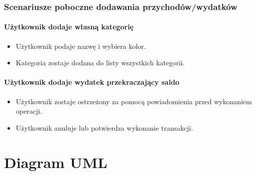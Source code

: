 \documentclass[12pt,a4paper,oneside]{article}
\begin{document}
\subsubsection{Scenariusze poboczne dodawania przychodów/wydatków}
\paragraph{Użytkownik dodaje własną kategorię}
\begin{itemize}
    \item Użytkownik podaje nazwę i wybiera kolor.
    \item Kategoria zostaje dodana do listy wszystkich kategorii.
\end{itemize}

\paragraph{Użytkownik dodaje wydatek przekraczający saldo}
\begin{itemize}
    \item Użytkownik zostaje ostrzeżony za pomocą powiadomienia przed wykonaniem
          operacji.
    \item Użytkownik anuluje lub potwierdza wykonanie transakcji.
\end{itemize}

\section{Diagram UML}
\begin{figure}[H]
\end{figure}
\end{document}
